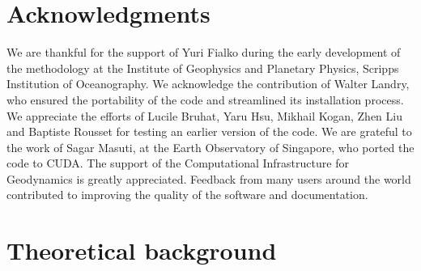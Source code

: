 \documentclass[10pt]{article}
\begin{document}
\section{Acknowledgments}
We are thankful for the support of Yuri Fialko during the early development of the methodology at the Institute of Geophysics and Planetary Physics, Scripps Institution of Oceanography. We acknowledge the contribution of Walter Landry, who ensured the portability of the code and streamlined its installation process. We appreciate the efforts of Lucile Bruhat, Yaru Hsu, Mikhail Kogan, Zhen Liu and Baptiste Rousset for testing an earlier version of the code. We are grateful to the work of Sagar Masuti, at the Earth Observatory of Singapore, who ported the code to CUDA. The support of the Computational Infrastructure for Geodynamics is greatly appreciated. Feedback from many users around the world contributed to improving the quality of the software and documentation.


\vspace{2.5cm}
\let\thefootnote\relax{}


\pagebreak

\tableofcontents

\pagebreak

\section{Theoretical background}
\end{document}
